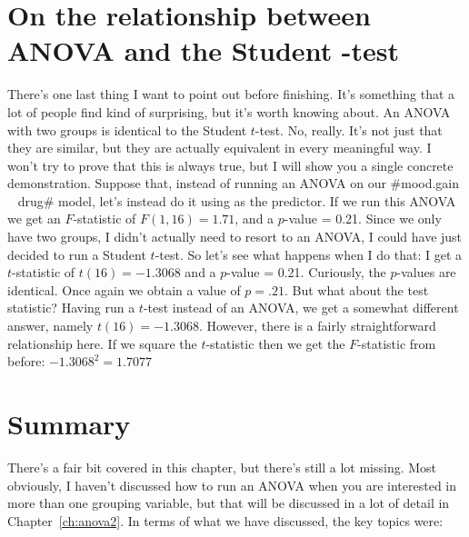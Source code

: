 \section{On the relationship between ANOVA and the Student \texorpdfstring{}{}-test~\label{sec:anovaandt}}

There's one last thing I want to point out before finishing. It's something that a lot of people find kind of surprising, but it's worth knowing about. An ANOVA with two groups is identical to the Student $t$-test. No, really. It's not just that they are similar, but they are actually equivalent in every meaningful way. I won't try to prove that this is always true, but I will show you a single concrete demonstration. Suppose that, instead of running an ANOVA on our \rtextverb#mood.gain ~ drug# model, let's instead do it using  as the predictor. If we run this ANOVA we get an $F$-statistic of  $F(1,16) = 1.71$, and a $p$-value = 0.21. Since we only have two groups, I didn't actually need to resort to an ANOVA, I could have just decided to run a Student $t$-test. So let's see what happens when I do that: I get a $t$-statistic of $t(16) = -1.3068$ and a $p$-value = 0.21. Curiously, the $p$-values are identical. Once again we obtain a value of $p = .21$. But what about the test statistic? Having run a $t$-test instead of an ANOVA, we get a somewhat different answer, namely $t(16) = -1.3068$. However, there is a fairly straightforward relationship here. If we square the $t$-statistic then we get the $F$-statistic from before: $-1.3068^2 = 1.7077$


\section{Summary}

There's a fair bit covered in this chapter, but there's still a lot missing. Most obviously, I haven't discussed how to run an ANOVA when you are interested in more than one grouping variable, but that will be discussed in a lot of detail in Chapter~\ref{ch:anova2}. In terms of what we have discussed, the key topics were:


